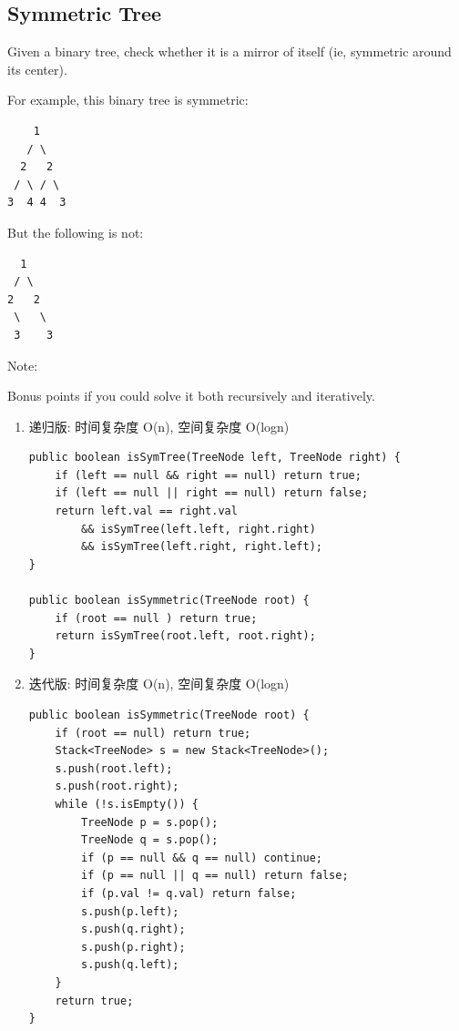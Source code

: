 \documentclass[12pt]{book}
\begin{document}
\subsection{Symmetric Tree}
\label{sec-4-2-9}
Given a binary tree, check whether it is a mirror of itself (ie, symmetric around its center).

For example, this binary tree is symmetric:
\lstset{language=java,label= ,caption= ,numbers=none}
\begin{lstlisting}
    1
   / \
  2   2
 / \ / \
3  4 4  3
\end{lstlisting}
But the following is not:
\lstset{language=java,label= ,caption= ,numbers=none}
\begin{lstlisting}
  1
 / \
2   2
 \   \
 3    3
\end{lstlisting}
Note:

Bonus points if you could solve it both recursively and iteratively.
\begin{enumerate}
\item 递归版: 时间复杂度 O(n), 空间复杂度 O(logn)
\label{sec-4-2-9-1}

\lstset{language=java,label= ,caption= ,numbers=none}
\begin{lstlisting}
public boolean isSymTree(TreeNode left, TreeNode right) {
    if (left == null && right == null) return true;
    if (left == null || right == null) return false;
    return left.val == right.val
        && isSymTree(left.left, right.right)
        && isSymTree(left.right, right.left);
}

public boolean isSymmetric(TreeNode root) {
    if (root == null ) return true;
    return isSymTree(root.left, root.right);
}
\end{lstlisting}

\item 迭代版: 时间复杂度 O(n), 空间复杂度 O(logn)
\label{sec-4-2-9-2}

\lstset{language=java,label= ,caption= ,numbers=none}
\begin{lstlisting}
public boolean isSymmetric(TreeNode root) {
    if (root == null) return true;
    Stack<TreeNode> s = new Stack<TreeNode>();
    s.push(root.left);
    s.push(root.right);
    while (!s.isEmpty()) {
        TreeNode p = s.pop();
        TreeNode q = s.pop();
        if (p == null && q == null) continue;
        if (p == null || q == null) return false;
        if (p.val != q.val) return false;
        s.push(p.left);
        s.push(q.right);
        s.push(p.right);
        s.push(q.left);
    }
    return true;
}
\end{lstlisting}
\end{enumerate}
\end{document}

